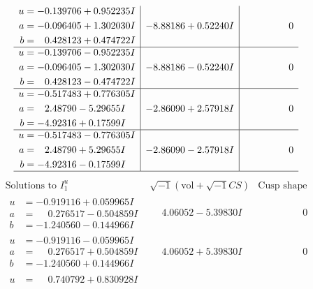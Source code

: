 \documentclass[1p]{elsarticle_modified}
\theoremstyle{definition}
\newcommand{\I}{\sqrt{-1}}
\begin{document}
$$\begin{array}{c|c|c}
\begin{aligned}
u &= -0.139706 + 0.952235 I \\
a &= -0.096405 + 1.302030 I \\
b &= \phantom{-}0.428123 + 0.474722 I\end{aligned}
 & -8.88186 + 0.52240 I & \phantom{-0.000000 } 0 \\ \hline\begin{aligned}
u &= -0.139706 - 0.952235 I \\
a &= -0.096405 - 1.302030 I \\
b &= \phantom{-}0.428123 - 0.474722 I\end{aligned}
 & -8.88186 - 0.52240 I & \phantom{-0.000000 } 0 \\ \hline\begin{aligned}
u &= -0.517483 + 0.776305 I \\
a &= \phantom{-}2.48790 - 5.29655 I \\
b &= -4.92316 + 0.17599 I\end{aligned}
 & -2.86090 + 2.57918 I & \phantom{-0.000000 } 0 \\ \hline\begin{aligned}
u &= -0.517483 - 0.776305 I \\
a &= \phantom{-}2.48790 + 5.29655 I \\
b &= -4.92316 - 0.17599 I\end{aligned}
 & -2.86090 - 2.57918 I & \phantom{-0.000000 } 0\\
 \hline 
 \end{array}$$\newpage$$\begin{array}{c|c|c}  
\text{Solutions to }I^u_{1}& \I (\text{vol} + \sqrt{-1}CS) & \text{Cusp shape}\\
 \hline 
\begin{aligned}
u &= -0.919116 + 0.059965 I \\
a &= \phantom{-}0.276517 - 0.504859 I \\
b &= -1.240560 - 0.144966 I\end{aligned}
 & \phantom{-}4.06052 - 5.39830 I & \phantom{-0.000000 } 0 \\ \hline\begin{aligned}
u &= -0.919116 - 0.059965 I \\
a &= \phantom{-}0.276517 + 0.504859 I \\
b &= -1.240560 + 0.144966 I\end{aligned}
 & \phantom{-}4.06052 + 5.39830 I & \phantom{-0.000000 } 0 \\ \hline\begin{aligned}
u &= \phantom{-}0.740792 + 0.830928 I \\

\end{aligned}
\end{array}$$
\end{document}
